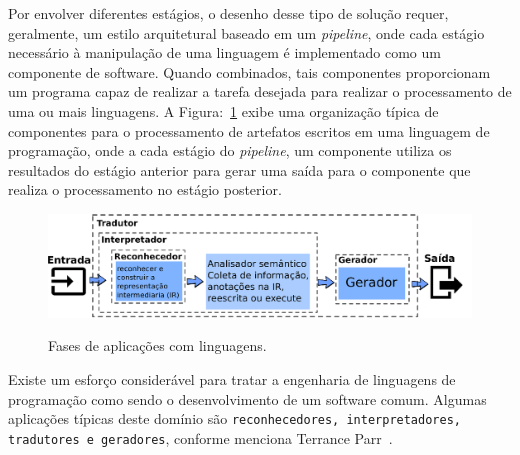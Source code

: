 Por envolver diferentes est\'{a}gios, o desenho desse tipo de solu\c c\~{a}o requer, geralmente, 
um estilo arquitetural baseado em um \emph{pipeline},  onde cada est\'{a}gio necess\'{a}rio \`{a}  
 manipula\c{c}\~{a}o de uma linguagem \'{e} implementado como um componente de software. Quando combinados, 
tais componentes proporcionam um programa capaz de realizar a tarefa desejada para realizar o processamento 
de uma ou mais linguagens. A Figura:~\ref{fig:stagesLanguageApp} exibe uma organiza\c c\~{a}o 
t\'{i}pica de componentes para o processamento de artefatos escritos em uma linguagem de 
programa\c c\~{a}o, onde a cada est\'{a}gio do \emph{pipeline}, um componente 
utiliza os resultados do est\'{a}gio anterior para gerar uma sa\'{i}da para o componente 
que realiza o processamento no est\'{a}gio posterior.  

\begin{figure}[h]
  \center
  \includegraphics[scale=0.9]{Imagens/stagesLanguageApp}
  \label{fig:stagesLanguageApp}
  \caption{Fases de aplica\c{c}\~{o}es com linguagens.}
\end{figure}

Existe um esfor\c{c}o consider\'{a}vel para tratar a engenharia de linguagens de programa\c{c}\~{a}o como sendo o desenvolvimento de um software comum. 
Algumas aplica\c{c}\~{o}es t\'{i}picas deste dom\'{i}nio s\~{a}o \texttt{reconhecedores, interpretadores, tradutores e geradores}, 
conforme menciona Terrance Parr~\cite{Parr:2009:LIP:1823613}. 



